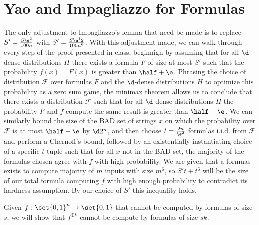 \documentclass{article}
\begin{document}
\section{Yao and Impagliazzo for Formulas}
\begin{alphalist}
  \renewcommand{\F}{\mathcal{F}}
\item The only adjustment to Impagliazzo's lemma that need be made is to replace $S' = \frac{S\e^2}{100n}$ with $S' = \frac{S\e^12}{100n^6}$. With this adjustment made, we can walk through every step of the proof presented in class, beginnign by assuming that for all $\d$-dense distributions $H$ there exists a formula $F$ of size at most $S'$ such that the probability $f(x) = F(x)$ is greater than $\half + \e$. Phrasing the choice of distribution $\F$ over formulas $F$ and the $\d$-dense distributions $H$ to optimize this probability as a zero sum game, the minimax theorem allows us to conclude that there exists a distribution $\F$ such that for all $\d$-dense distributions $H$ the probability $F$ and $f$ compute the same result is greater than $\half + \e$. We can similarly bound the size of the BAD set of strings $x$ on which the probability over $\F$ is at most $\half + \e$ by $\d2^n$, and then choose $t = \frac{2n}{\e^2}$ formulas i.i.d. from $\F$ and perform a Chernoff's bound, followed by an existentially instantiating choice of a specific $t$-tuple such that for all $x$ not in the BAD set, the majority of the formulas chosen agree with $f$ with high probability. We are given that a formuas exists to compute majority of $m$ inputs with size $m^6$, so $S't + t^6$ will be the size of our total formula computing $f$ with high enough probability to contradict its hardness assumption. By our choice of $S'$ this inequality holds.
\item  Given $f: \set{0, 1}^n \to \set{0, 1}$ that cannot be computed by formulas of size $s$, we will show that $f^{\oplus k}$ cannot be compute by formulas of size $sk$.
\end{alphalist}
\end{document}
